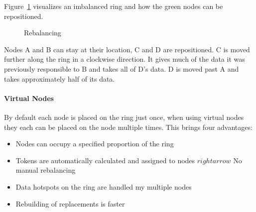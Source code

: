 Figure~\ref{fig:cassandra:rebalancing} visualizes an imbalanced ring and how the green nodes can be repositioned.


\begin{figure}[ht]
  \centering
  \caption{Rebalancing}
  \label{fig:cassandra:rebalancing}
\end{figure}

Nodes A and B can stay at their location, C and D are repositioned. C is moved further along the ring in a clockwise direction. It gives much of the data it was previously responsible to B and takes all of D's data. D is moved past A and takes approximately half of its data.

\paragraph{Virtual Nodes}

By default each node is placed on the ring just once, when using virtual nodes they each can be placed on the node multiple times. This brings four advantages: \autocite{datastax_vnodes, yelp_balancing}

\begin{itemize}
  \item Nodes can occupy a specified proportion of the ring
  \item Tokens are automatically calculated and assigned to nodes $rightarrow$ No manual rebalancing
  \item Data hotspots on the ring are handled my multiple nodes
  \item Rebuilding of replacements is faster
\end{itemize}

